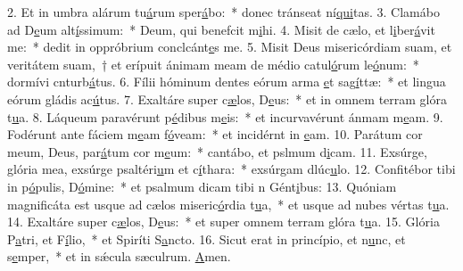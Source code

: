 2. Et in umbra alárum tu\uline{á}rum sper\uline{á}bo:~* donec tránseat ní\uline{qui}tas.
3. Clamábo ad D\uline{e}um alt\uline{í}ssimum:~* Deum, qui benefcit m\uline{i}hi.
4. Misit de cælo, et l\uline{i}ber\uline{á}vit me:~* dedit in oppróbrium conclcánt\uline{e}s me.
5. Misit Deus misericórdiam suam, et veritátem suam,~† et erípuit ánimam meam de médio catul\uline{ó}rum le\uline{ó}num:~* dormívi cnturb\uline{á}tus.
6. Fílii hóminum dentes eórum arma \uline{e}t sag\uline{í}ttæ:~* et lingua eórum gládis ac\uline{ú}tus.
7. Exaltáre super c\uline{æ}los, D\uline{e}us:~* et in omnem terram glóra t\uline{u}a.
8. Láqueum paravérunt p\uline{é}dibus m\uline{e}is:~* et incurvavérunt ánmam m\uline{e}am.
9. Fodérunt ante fáciem m\uline{e}am f\uline{ó}veam:~* et incidérnt in \uline{e}am.
10. Parátum cor meum, Deus, par\uline{á}tum cor m\uline{e}um:~* cantábo, et pslmum d\uline{i}cam.
11. Exsúrge, glória mea, exsúrge psaltéri\uline{u}m et c\uline{í}thara:~* exsúrgam dlúc\uline{u}lo.
12. Confitébor tibi in p\uline{ó}pulis, D\uline{ó}mine:~* et psalmum dicam tibi n Gént\uline{i}bus:
13. Quóniam magnificáta est usque ad cælos miseric\uline{ó}rdia t\uline{u}a,~* et usque ad nubes vértas t\uline{u}a.
14. Exaltáre super c\uline{æ}los, D\uline{e}us:~* et super omnem terram glóra t\uline{u}a.
15. Glória P\uline{a}tri, et F\uline{í}lio,~* et Spiríti S\uline{a}ncto.
16. Sicut erat in princípio, et n\uline{u}nc, et s\uline{e}mper,~* et in sǽcula sæculrum. \uline{A}men.
